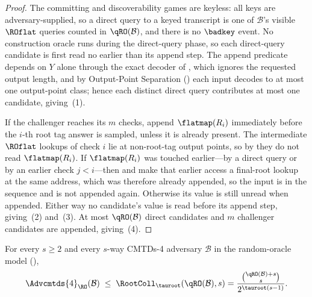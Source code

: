 \begin{proof}
The committing and discoverability games are keyless: all keys are
adversary-supplied, so a direct query to a keyed transcript is one of
$\mathcal{B}$'s visible $\ROflat$ queries counted in $\qRO(\mathcal{B})$,
and there is no $\badkey$ event. No construction oracle runs during the
direct-query phase, so each direct-query candidate is first read no
earlier than its append step. The append predicate depends on $Y$ alone
through the exact decoder of , which ignores the
requested output length, and by Output-Point Separation
() each input decodes to at most one output-point
class; hence each distinct direct query contributes at most one
candidate, giving~(1).

If the challenger reaches its $m$ checks, append $\flatmap(R_i)$
immediately before the $i$-th root tag answer is sampled, unless it is
already present. The intermediate $\ROflat$ lookups of check $i$ lie at
non-root-tag output points, so by  they do not read
$\flatmap(R_i)$. If $\flatmap(R_i)$ was touched earlier---by a direct
query or by an earlier check $j < i$---then  and
 make that earlier access a final-root lookup at the
same address, which was therefore already appended, so the input is in
the sequence and is not appended again. Otherwise its value is still
unread when appended. Either way no candidate's value is read before its
append step, giving~(2) and~(3). At most $\qRO(\mathcal{B})$ direct
candidates and $m$ challenger candidates are appended, giving~(4).
\end{proof}

\begin{theorem}
\label{thm:cmtds4-ro}
For every $s \geq 2$ and every $s$-way CMTDs-4
adversary $\mathcal{B}$ in the \TW{} random-oracle model
(),
\[
  \Advcmtds{4}_\RO(\mathcal{B})
  \;\leq\; \RootColl_{\tauroot}(\qRO(\mathcal{B}), s)
  = \frac{\binom{\qRO(\mathcal{B}) + s}{s}}{2^{\tauroot (s - 1)}}.
\]
\end{theorem}

